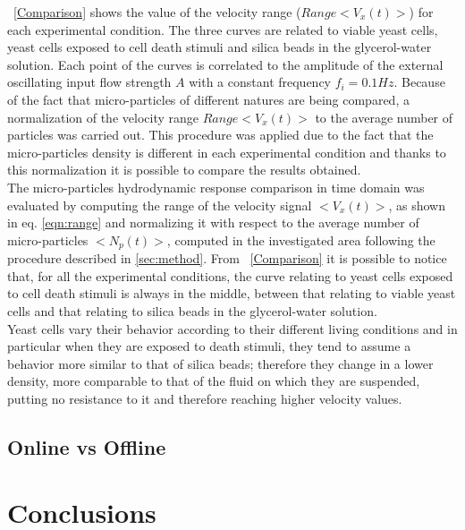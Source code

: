 \documentclass[journal]{IEEEtran}
\theoremstyle{definition}
\theoremstyle{remark}
\begin{document}
~\fig\ref{Comparison} shows the value of the velocity range ($Range<V_x(t)>$) for each experimental condition. The three curves are related to viable yeast cells, yeast cells exposed to cell death stimuli and silica beads in the glycerol-water solution. Each point of the curves is correlated to the amplitude of the external oscillating input flow strength $A$ with a constant frequency $f_i= 0.1 Hz$. 
Because of the fact that micro-particles of different natures are being compared, a normalization of the velocity range $Range<V_x(t)>$ to the average number of particles was carried out. This procedure was applied due to the fact that the micro-particles density is different in each experimental condition and thanks to this normalization it is possible to compare the results obtained. 
\\The micro-particles hydrodynamic response comparison in time domain was evaluated by computing the range of the velocity signal $<V_x(t)>$, as shown in eq. \ref{eqn:range} and normalizing it with respect to the average number of micro-particles $<N_p(t)>$, computed in the investigated area following the procedure described in \sect\ref{sec:method}.
From ~\fig\ref{Comparison} it is possible to notice that, for all the experimental conditions, the curve relating to yeast cells exposed to cell death stimuli is always in the middle, between that relating to viable yeast cells and that relating to silica beads in the glycerol-water solution.
\\Yeast cells vary their behavior according to their different living conditions and in particular when they are exposed to death stimuli, they tend to assume a behavior more similar to that of silica beads; therefore they change in a lower density, more comparable to that of the fluid on which they are suspended, putting no resistance to it and therefore reaching higher velocity values.

\subsection{Online vs Offline}\label{sec:OnlineOffline}

\section{Conclusions}



%
\end{document}

